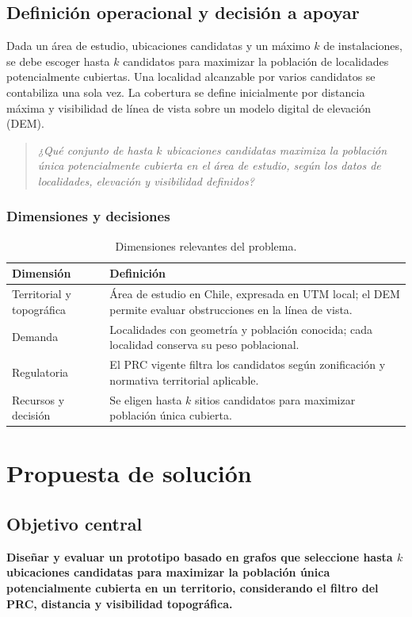 \documentclass[12pt,letterpaper]{article}
\begin{document}
\subsection{Definición operacional y decisión a apoyar}
Dada un área de estudio, ubicaciones candidatas y un máximo $k$ de instalaciones, se debe escoger hasta $k$ candidatos para maximizar la población de localidades potencialmente cubiertas. Una localidad alcanzable por varios candidatos se contabiliza una sola vez. La cobertura se define inicialmente por distancia máxima y visibilidad de línea de vista sobre un modelo digital de elevación (DEM).

\begin{quote}\itshape
¿Qué conjunto de hasta $k$ ubicaciones candidatas maximiza la población única potencialmente cubierta en el área de estudio, según los datos de localidades, elevación y visibilidad definidos?
\end{quote}

\subsubsection{Dimensiones y decisiones}
\begin{table}[h]
\centering\small
\begin{tabular}{p{3.2cm}p{10cm}}
\toprule
\textbf{Dimensión} & \textbf{Definición} \\
\midrule
Territorial y topográfica & Área de estudio en Chile, expresada en UTM local; el DEM permite evaluar obstrucciones en la línea de vista. \\
Demanda & Localidades con geometría y población conocida; cada localidad conserva su peso poblacional. \\
Regulatoria & El PRC vigente filtra los candidatos según zonificación y normativa territorial aplicable. \\
Recursos y decisión & Se eligen hasta $k$ sitios candidatos para maximizar población única cubierta. \\
\bottomrule
\end{tabular}
\caption{Dimensiones relevantes del problema.}
\end{table}

\section{Propuesta de solución}

\subsection{Objetivo central}
\textbf{Diseñar y evaluar un prototipo basado en grafos que seleccione hasta $k$ ubicaciones candidatas para maximizar la población única potencialmente cubierta en un territorio, considerando el filtro del PRC, distancia y visibilidad topográfica.}
\end{document}

